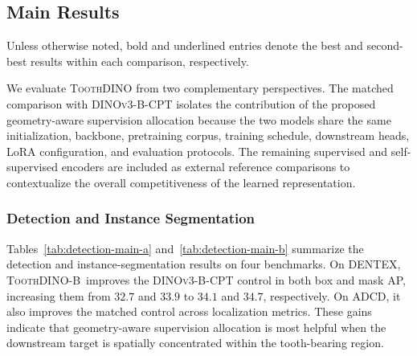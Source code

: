 \documentclass[conference]{IEEEtran}
\newcommand{\ToothDINO}{\textsc{ToothDINO}}
\newcommand{\DCT}{\textsc{DINOv3-B-CPT}}
\newcommand{\dataset}[1]{\textsc{#1}}
\newcommand{\ourmethod}{\ToothDINO{}-B~}
\begin{document}
\subsection{Main Results}
\label{sec:main-results}
Unless otherwise noted, bold and underlined entries denote the best and second-best results within each comparison, respectively.

We evaluate \ToothDINO{} from two complementary perspectives. The
matched comparison with \DCT{} isolates the contribution of the
proposed geometry-aware supervision allocation because the two models
share the same initialization, backbone, pretraining corpus, training
schedule, downstream heads, LoRA configuration, and evaluation
protocols. The remaining supervised and self-supervised encoders are
included as external reference comparisons to contextualize the
overall competitiveness of the learned representation.

\subsubsection{Detection and Instance Segmentation}
Tables~\ref{tab:detection-main-a} and~\ref{tab:detection-main-b} summarize the detection and instance-segmentation results on four benchmarks. On \dataset{DENTEX}, \ourmethod improves the \DCT{} control in both box and mask AP, increasing them from $32.7$ and $33.9$ to $34.1$ and $34.7$, respectively. On \dataset{ADCD}, it also improves the matched control across localization metrics. These gains indicate that geometry-aware supervision allocation is most helpful when the downstream target is spatially concentrated within the tooth-bearing region.
\end{document}
